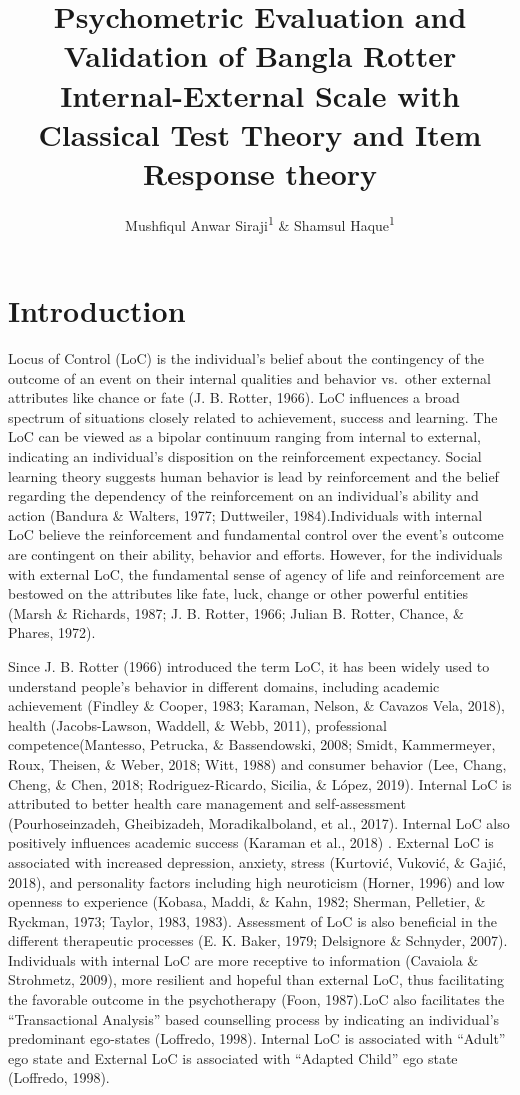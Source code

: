 \documentclass[
  english,
  man]{apa6}
\title{Psychometric Evaluation and Validation of Bangla Rotter Internal-External Scale with Classical Test Theory and Item Response theory}
\author{Mushfiqul Anwar Siraji\textsuperscript{1} \& Shamsul Haque\textsuperscript{1}}
\date{}
\affiliation{\vspace{0.5cm}\textsuperscript{1} Monash University, Malaysia}
\begin{document}
\maketitle

\hypertarget{introduction}{%
\section{Introduction}\label{introduction}}

Locus of Control (LoC) is the individual's belief about the contingency of the outcome of an event on their internal qualities and behavior vs.~other external attributes like chance or fate (J. B. Rotter, 1966). LoC influences a broad spectrum of situations closely related to achievement, success and learning. The LoC can be viewed as a bipolar continuum ranging from internal to external, indicating an individual's disposition on the reinforcement expectancy. Social learning theory suggests human behavior is lead by reinforcement and the belief regarding the dependency of the reinforcement on an individual's ability and action (Bandura \& Walters, 1977; Duttweiler, 1984).Individuals with internal LoC believe the reinforcement and fundamental control over the event's outcome are contingent on their ability, behavior and efforts. However, for the individuals with external LoC, the fundamental sense of agency of life and reinforcement are bestowed on the attributes like fate, luck, change or other powerful entities (Marsh \& Richards, 1987; J. B. Rotter, 1966; Julian B. Rotter, Chance, \& Phares, 1972).

Since J. B. Rotter (1966) introduced the term LoC, it has been widely used to understand people's behavior in different domains, including academic achievement (Findley \& Cooper, 1983; Karaman, Nelson, \& Cavazos Vela, 2018), health (Jacobs-Lawson, Waddell, \& Webb, 2011), professional competence(Mantesso, Petrucka, \& Bassendowski, 2008; Smidt, Kammermeyer, Roux, Theisen, \& Weber, 2018; Witt, 1988) and consumer behavior (Lee, Chang, Cheng, \& Chen, 2018; Rodriguez-Ricardo, Sicilia, \& López, 2019). Internal LoC is attributed to better health care management and self-assessment (Pourhoseinzadeh, Gheibizadeh, Moradikalboland, et al., 2017). Internal LoC also positively influences academic success (Karaman et al., 2018) . External LoC is associated with increased depression, anxiety, stress (Kurtović, Vuković, \& Gajić, 2018), and personality factors including high neuroticism (Horner, 1996) and low openness to experience (Kobasa, Maddi, \& Kahn, 1982; Sherman, Pelletier, \& Ryckman, 1973; Taylor, 1983, 1983). Assessment of LoC is also beneficial in the different therapeutic processes (E. K. Baker, 1979; Delsignore \& Schnyder, 2007). Individuals with internal LoC are more receptive to information (Cavaiola \& Strohmetz, 2009), more resilient and hopeful than external LoC, thus facilitating the favorable outcome in the psychotherapy (Foon, 1987).LoC also facilitates the ``Transactional Analysis'' based counselling process by indicating an individual's predominant ego-states (Loffredo, 1998). Internal LoC is associated with ``Adult'' ego state and External LoC is associated with ``Adapted Child'' ego state (Loffredo, 1998).
\end{document}
